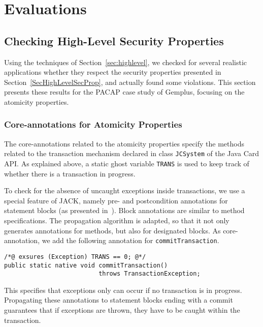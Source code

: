 \section{Evaluations}
\subsection{Checking High-Level Security Properties}\label{SecResults} 

Using the techniques of Section~\ref{sec:highlevel}, we checked for
several realistic applications whether they respect the security
properties presented in Section~\ref{SecHighLevelSecProp}, and
actually found some violations.  This section presents these results
for the PACAP case study of Gemplus, focusing on the atomicity properties.


\subsubsection{Core-annotations for Atomicity Properties}

The core-annotations related to the atomicity properties specify the
methods related to the transaction mechanism declared in class
\texttt{JCSystem} of the Java Card API. As explained above, a static
ghost variable \texttt{TRANS} is used to keep track of whether there
is a transaction in progress.  


To check for the absence of uncaught exceptions inside transactions,
we use a special feature of JACK, namely pre- and postcondition
annotations for statement blocks (as presented
in~\cite{BRL-JACK}). Block annotations are  similar to method
specifications. The propagation algorithm is adapted, so that it not
only generates annotations for methods, but also for designated
blocks. As core-annotation, we add the following annotation for
\texttt{commitTransaction}. 
\begin{verbatim}
/*@ exsures (Exception) TRANS == 0; @*/
public static native void commitTransaction() 
                          throws TransactionException;
\end{verbatim}
This specifies that exceptions only can occur if no transaction is in
progress. Propagating these annotations to statement blocks ending
with a commit guarantees that if exceptions are thrown, they have to
be caught within the transaction.



